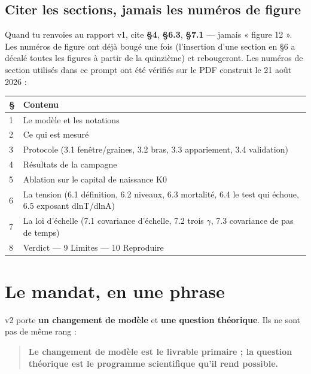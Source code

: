 \documentclass[11pt,a4paper]{article}
\begin{document}
\subsection*{Citer les sections, jamais les numéros de figure}

Quand tu renvoies au rapport v1, cite \textbf{§4}, \textbf{§6.3}, \textbf{§7.1} --- jamais « figure 12 ». Les numéros de figure ont déjà bougé une fois (l'insertion d'une section en §6 a décalé toutes les figures à partir de la quinzième) et rebougeront. Les numéros de section utilisés dans ce prompt ont été vérifiés sur le PDF construit le 21 août 2026 :

\begin{center}
\begin{tabularx}{\linewidth}{@{}lX@{}}
\toprule
\textbf{§} & \textbf{Contenu} \\
\midrule
1 & Le modèle et les notations \\
2 & Ce qui est mesuré \\
3 & Protocole (3.1 fenêtre/graines, 3.2 bras, 3.3 appariement, 3.4 validation) \\
4 & Résultats de la campagne \\
5 & Ablation sur le capital de naissance K0 \\
6 & La tension (6.1 définition, 6.2 niveaux, 6.3 mortalité, 6.4 le test qui échoue, 6.5 exposant dlnT/dlnA) \\
7 & La loi d'échelle (7.1 covariance d'échelle, 7.2 trois \ensuremath{\gamma}, 7.3 covariance de pas de temps) \\
8 & Verdict --- 9 Limites --- 10 Reproduire \\
\bottomrule
\end{tabularx}
\end{center}

\bigskip

\setcounter{section}{0}
\section{Le mandat, en une phrase}

v2 porte \textbf{un changement de modèle} et \textbf{une question théorique}. Ils ne sont pas de même rang :

\begin{quote}
\textbf{Le changement de modèle est le livrable primaire ; la question théorique est le programme scientifique qu'il rend possible.}
\end{quote}
\end{document}
